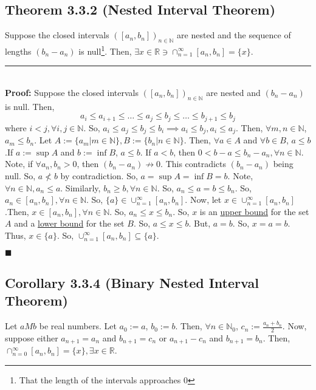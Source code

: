 \documentclass[11pt]{book}
\newcommand{\R}{\mathbb{R}}
\newcommand{\N}{\mathbb{N}}
\newcommand{\horline}{\noindent\rule{14.25cm}{0.6pt}\\}
\newcommand{\QED}{\begin{flushright}$\blacksquare$\end{flushright}}
\begin{document}
	\subsection{Theorem 3.3.2 (Nested Interval Theorem)}
	\label{subsec:theor332}
		\begin{theor}
			Suppose the closed intervals $([a_n,b_n])_{n \in \N}$ are nested and the sequence of lengths $(b_n - a_n)$ is null\footnote{That the length of the intervals
			approaches 0}. Then, $\exists x \in \R \ni \displaystyle\cap_{n = 1}^{\infty}{[a_n,b_n]} = \{x\}$.\hfill \break
			\horline
			\textbf{Proof:} Suppose the closed intervals $([a_n,b_n])_{n \in \N}$ are nested and $(b_n - a_n)$ is null. Then,
			$$a_i \leq a_{i+1} \leq \dots \leq a_j \leq b_j \leq \dots \leq b_{j+1} \leq b_j $$
			where $i < j, \forall i,j \in \N$. So, $a_i \leq a_j \leq b_j \leq b_i \implies a_i \leq b_j, a_i \leq a_j$. Then, $\forall m,n \in \N$, $a_m \leq b_n$. 
			Let $A:= \{a_m | m \in \N\}, B := \{b_n | n \in \N\}$. Then, $\forall a \in A$ and $\forall b \in B$, $a \leq b$.If $a:= \sup{A}$ and $b:= \inf{B}$, 
			$a \leq b$. If $a < b$, then $0 < b - a \leq b_n - a_n, \forall n \in \N$. Note, if $\forall a_n,b_n > 0$, then $(b_n -a_n) \not\to 0$. This contradicts
			$(b_n - a_n)$ being null. So, $a \not < b$ by contradiction. So, $a = \sup{A} = \inf{B} = b$.\hfill \break
			Note, $\forall n \in \N, a_n \leq a$. Similarly, $b_n \geq b, \forall n \in \N$. So, $a_n \leq a = b \leq b_n$. So, $a_n \in [a_n, b_n], \forall n \in \N$. 
			So, $\{a\} \in \displaystyle\cup_{n = 1}^{\infty}{[a_n,b_n]}$. \hfill \break
			Now, let $x \in \displaystyle\cup_{n = 1}^{\infty}{[a_n,b_n]}$ .Then, $x \in [a_n,b_n], \forall n \in \N$. So, $a_n \leq x \leq b_n$. So, $x$ is an 
			\hyperref[subsec:upperbound]{upper bound} for the set $A$ and a \hyperref[subsec:lowerbound]{lower bound} for the set $B$. So, $a \leq x \leq b$. But, 
			$a = b$. So, $x = a = b$. Thus, $x \in \{a\}$. So, $\displaystyle\cup_{n = 1}^{\infty}{[a_n,b_n]} \subseteq \{a\}$. \QED
		\end{theor}
	\subsection{Corollary 3.3.4 (Binary Nested Interval Theorem)}
	\label{subsec:cor334}
		\begin{cor}
			Let $a M b$ be real numbers. Let $a_0 := a$, $b_0 := b$. Then, $\forall n \in \N_0$, $c_n := \frac{a_n + b_n}{2}$. Now, suppose either 
			$a_{n+1} = a_n$ and $b_{n+1} = c_n$ or $a_{n+1} - c_n$ and $b_{n+1} = b_n$. Then, $\displaystyle\cap_{n = 0}^{\infty}{[a_n,b_n] = \{x\}}, \exists x 
			\in \R$.
		\end{cor}
\end{document}
